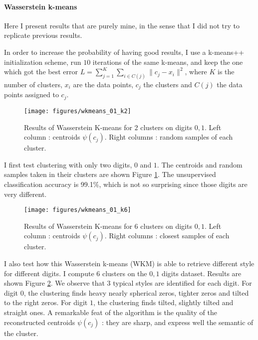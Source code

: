 \documentclass{article}
\begin{document}
\paragraph{Wasserstein k-means}
Here I present results that are purely mine, in the sense that I did not try to replicate previous results.

In order to increase the probability of having good results, I use a k-means++ \cite{arthur2007k} initialization scheme, run $10$ iterations of the same k-means, and keep the one which got the best error $L = \sum_{j=1}^{K} \sum_{i \in C(j)} \| c_j - x_i \|^2$, where $K$ is the number of clusters, $x_i$ are the data points, $c_j$ the clusters and $C(j)$ the data points assigned to $c_j$.

\begin{figure}[!htb]
	\centering
	\texttt{[image: figures/wkmeans\_01\_k2]}
	\caption{Results of Wasserstein K-means for $2$ clusters on digits $0, 1$. Left column : centroids $\psi(c_j)$. Right columns : random samples of each cluster.}
	\label{fig:wkm01}
\end{figure}

I first test clustering with only two digits, $0$ and $1$. The centroids and random samples taken in their clusters are shown Figure \ref{fig:wkm01}. The unsupervised classification accuracy is 99.1\%, which is not so surprising since those digits are very different.

\begin{figure}[!htb]
	\centering
	\texttt{[image: figures/wkmeans\_01\_k6]}
	\caption{Results of Wasserstein K-means for $6$ clusters on digits $0, 1$. Left column : centroids $\psi(c_j)$. Right columns : closest samples of each cluster.}
	\label{fig:wkm01_6}
\end{figure}

I also test how this Wasserstein k-means (WKM) is able to retrieve different style for different digits. I compute $6$ clusters on the $0, 1$ digits dataset. Results are shown Figure \ref{fig:wkm01_6}. We observe that $3$ typical styles are identified for each digit. For digit $0$, the clustering finds heavy nearly spherical zeros, tighter zeros and tilted to the right zeros. For digit $1$, the clustering finds tilted, slightly tilted and straight ones. A remarkable feat of the algorithm is the quality of the reconstructed centroids $\psi(c_j)$ : they are sharp, and express well the semantic of the cluster.
\end{document}
